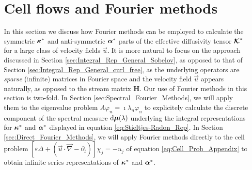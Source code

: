 \documentclass[11pt]{amsart}
\renewcommand{\d}{\mathrm{d}}
\newcommand{\Hb}{\mathbf{H}}
\newcommand\Kbc{\mbox{\boldmath${\mathcal{K}}$}}
\newcommand\bmu{\mbox{\boldmath${\mu}$}}
\newcommand\balpha{\mbox{\boldmath${\alpha}$}}
\newcommand\bkappa{\mbox{\boldmath${\kappa}$}}
\begin{document}
\section{Cell flows and Fourier methods}\label{sec:Fourier_Methods}
%
In this section we discuss how Fourier methods can be employed to
calculate the symmetric $\bkappa^*$ and anti-symmetric $\balpha^*$
parts of the effective diffusivity tensor $\Kbc^*$ for a large class
of velocity fields $\vec{u}$. It is more natural  to focus on the
approach discussed in Section \ref{sec:Integral_Rep_General_Sobelov},
as opposed to that of Section
\ref{sec:Integral_Rep_General_curl_free}, as the underlying operators
are \emph{sparse} (infinite) matrices in Fourier space and the 
velocity field $\vec{u}$ appears naturally, as opposed to the stream
matrix $\Hb$. Our use of Fourier methods in this section is
two-fold. In Section \ref{sec:Spectral_Fourier_Methods}, we will apply
them to the eigenvalue problem $A\varphi_n=\imath\lambda_n\varphi_n$
to explicitely calculate the discrete component of the spectral
measure $\d\bmu(\lambda)$ underlying the integral representations for
$\bkappa^*$ and $\balpha^*$ displayed in equation
\eqref{eq:Stieltjes-Radon_Rep}. In Section
\ref{sec:Direct_Fourier_Methods}, we will apply Fourier methods
directly to the cell problem $[\varepsilon\Delta+(\vec{u}\cdot\vec{\nabla}-\partial_t)]\chi_j=-u_j$ of
equation \eqref{eq:Cell_Prob_Appendix} to obtain infinite series
representations of $\bkappa^*$ and $\balpha^*$.   




%
\end{document}
